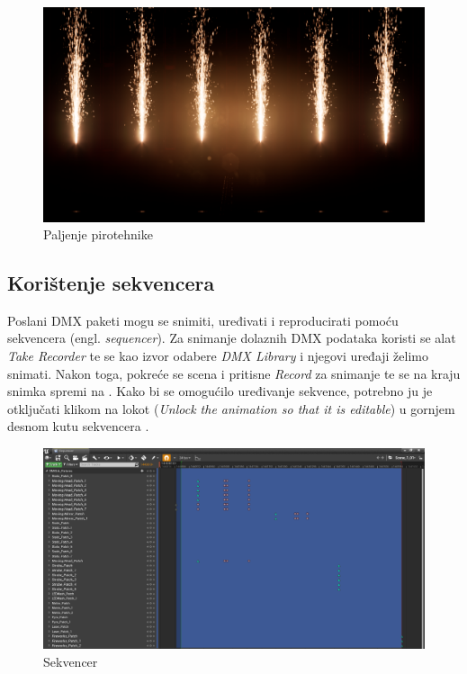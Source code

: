 \documentclass[times, utf8, zavrsni, numeric]{fer}
\begin{document}
\begin{figure}[htp]
	\centering
	\includegraphics[width=\linewidth]{slika 6-11.png}
	\caption{Paljenje pirotehnike}
	\label{fig:slika 6-11}
\end{figure}

\subsection{Korištenje sekvencera}
Poslani DMX paketi mogu se snimiti, uređivati i reproducirati pomoću sekvencera (engl. \emph{sequencer}). Za snimanje dolaznih DMX podataka koristi se alat \emph{Take Recorder} te se kao izvor odabere \emph{DMX Library} i njegovi uređaji želimo snimati. Nakon toga, pokreće se scena i pritisne \emph{Record} za snimanje te se na kraju snimka spremi na . Kako bi se omogućilo uređivanje sekvence, potrebno ju je otključati klikom na lokot (\emph{Unlock the animation so that it is editable}) u gornjem desnom kutu sekvencera \cite{dmx_tracks}.\\

\begin{figure}[htp]
	\centering
	\includegraphics[width=\linewidth]{slika 6-12.png}
	\caption{Sekvencer}
	\label{fig:slika 6-12}
\end{figure}
\end{document}
